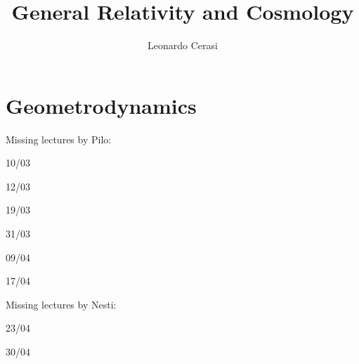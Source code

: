 \documentclass[a4paper, 12pt]{book}
\title{\Huge\sffamily\textbf{General Relativity and Cosmology}}
\author{Leonardo Cerasi}
\date{}
\numberwithin{equation}{section}
\begin{document}
\frontmatter

\maketitle

\mainmatter

\part{Geometrodynamics}
\pagestyle{body}

Missing lectures by Pilo:

10/03

12/03

19/03

31/03

09/04

17/04

Missing lectures by Nesti:

23/04

30/04


\end{document}
